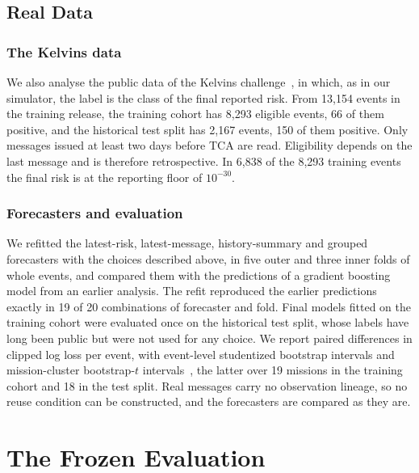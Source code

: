 \documentclass[conference]{IEEEtran}
\begin{document}
\subsection{Real Data}

\subsubsection*{The Kelvins data}
We also analyse the public data of the Kelvins challenge~\cite{uriot2022}, in which, as in our simulator, the label is the class of the final reported risk.
From 13,154 events in the training release, the training cohort has 8,293 eligible events, 66 of them positive, and the historical test split has 2,167 events, 150 of them positive.
Only messages issued at least two days before TCA are read. Eligibility depends on the last message and is therefore retrospective. In 6,838 of the 8,293 training events the final risk is at the reporting floor of $10^{-30}$.

\subsubsection*{Forecasters and evaluation}
We refitted the latest-risk, latest-message, history-summary and grouped forecasters with the choices described above, in five outer and three inner folds of whole events, and compared them with the predictions of a gradient boosting model from an earlier analysis.
The refit reproduced the earlier predictions exactly in 19 of 20 combinations of forecaster and fold. Final models fitted on the training cohort were evaluated once on the historical test split, whose labels have long been public but were not used for any choice. We report paired differences in clipped log loss per event, with event-level studentized bootstrap intervals and mission-cluster bootstrap-$t$ intervals~\cite{cameron2008}, the latter over 19 missions in the training cohort and 18 in the test split. Real messages carry no observation lineage, so no reuse condition can be constructed, and the forecasters are compared as they are.

\section{The Frozen Evaluation}\label{sec:protocol}
\end{document}
